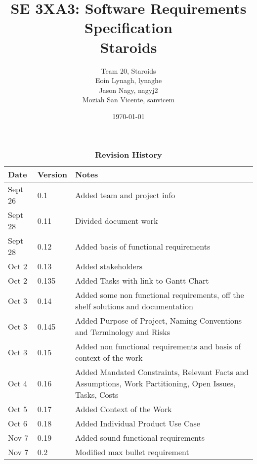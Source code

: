 \documentclass[12pt, titlepage]{article}
\title{SE 3XA3: Software Requirements Specification\\Staroids}
\author{Team 20, Staroids
		\\ Eoin Lynagh, lynaghe
		\\ Jason Nagy, nagyj2
		\\ Moziah San Vicente, sanvicem
}
\date{\today}
\begin{document}
\maketitle

\tableofcontents
\listoftables

\begin{table}[bp]
\caption{\bf Revision History}
\begin{tabularx}{\textwidth}{p{3cm}p{2cm}X}
\toprule {\bf Date} & {\bf Version} & {\bf Notes}\\
\midrule
Sept 26 & 0.1 & Added team and project info\\
Sept 28 & 0.11 & Divided document work\\
Sept 28 & 0.12 & Added basis of functional requirements\\
Oct 2 & 0.13 & Added stakeholders\\
Oct 2 & 0.135 & Added Tasks with link to Gantt Chart\\
Oct 3 & 0.14 & Added some non functional requirements, off the shelf solutions and documentation\\
Oct 3 & 0.145 & Added Purpose of Project, Naming Conventions and Terminology and Risks\\
Oct 3 & 0.15 & Added non functional requirements and basis of context of the work\\
Oct 4 & 0.16 & Added Mandated Constraints, Relevant Facts and Assumptions, Work Partitioning, Open Issues, Tasks, Costs\\
Oct 5 & 0.17 & Added Context of the Work\\
Oct 6 & 0.18 & Added Individual Product Use Case\\
Nov 7 & 0.19 & Added sound functional requirements\\
Nov 7 & 0.2 & Modified max bullet requirement\\
\bottomrule
\end{tabularx}
\end{table}

\newpage



\end{document}
